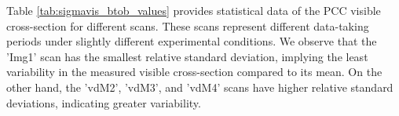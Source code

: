 \begin{itemize}

Table \ref{tab:sigmavis_btob_values} provides statistical data of the PCC visible cross-section for different scans. These scans represent different data-taking periods under slightly different experimental conditions. We observe that the 'Img1' scan has the smallest relative standard deviation, implying the least variability in the measured visible cross-section compared to its mean. On the other hand, the 'vdM2', 'vdM3', and 'vdM4' scans have higher relative standard deviations, indicating greater variability.


\end{itemize}
